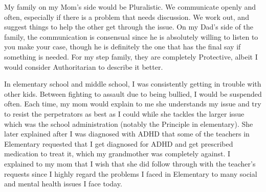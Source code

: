 \documentclass[12pt]{article}
\begin{document}
\par
My family on my Mom's side would be Pluralistic. We communicate openly and often, especially if there is a problem that needs discussion. We work out, and suggest things to help the other get through the issue. On my Dad's side of the family, the communication is consensual since he is absolutely willing to listen to you make your case, though he is definitely the one that has the final say if something is needed. For my step family, they are completely Protective, albeit I would consider Authoritarian to describe it better.
\par
In elementary school and middle school, I was consistently getting in trouble with other kids. Between fighting to assault due to being bullied, I would be suspended often. Each time, my mom would explain to me she understands my issue and try to resist the perpetrators as best as I could while she tackles the larger issue which was the school administration (notably the Principle in elementary). She later explained after I was diagnosed with ADHD that some of the teachers in Elementary requested that I get diagnosed for ADHD and get prescribed medication to treat it, which my grandmother was completely against. I explained to my mom that I wish that she did follow through with the teacher's requests since I highly regard the problems I faced in Elementary to many social and mental health issues I face today.
\end{document}
